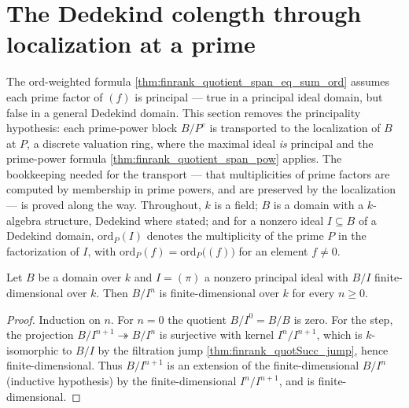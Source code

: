 \section{The Dedekind colength through localization at a prime}
\label{sec:localized_colength}

The ord-weighted formula \ref{thm:finrank_quotient_span_eq_sum_ord} assumes each prime
factor of \((f)\) is principal --- true in a principal ideal domain, but false in a
general Dedekind domain. This section removes the principality hypothesis: each
prime-power block \(B/P^e\) is transported to the localization of \(B\) at \(P\), a
discrete valuation ring, where the maximal ideal \emph{is} principal and the prime-power
formula \ref{thm:finrank_quotient_span_pow} applies. The bookkeeping needed for the
transport --- that multiplicities of prime factors are computed by membership in prime
powers, and are preserved by the localization --- is proved along the way. Throughout,
\(k\) is a field; \(B\) is a domain with a \(k\)-algebra structure, Dedekind where
stated; and for a nonzero ideal \(I \subseteq B\) of a Dedekind domain,
\(\mathrm{ord}_P(I)\) denotes the multiplicity of the prime \(P\) in the factorization of
\(I\), with \(\mathrm{ord}_P(f) = \mathrm{ord}_P\bigl((f)\bigr)\) for an element
\(f \neq 0\).

\begin{theorem}
  \label{thm:moduleFinite_quotient_pow_of_isPrincipal}
  \leanok
  Let \(B\) be a domain over \(k\) and \(I = (\pi)\) a nonzero principal ideal with
  \(B/I\) finite-dimensional over \(k\). Then \(B/I^n\) is finite-dimensional over
  \(k\) for every \(n \ge 0\).
\end{theorem}
\begin{proof}
  \leanok
  Induction on \(n\). For \(n = 0\) the quotient \(B/I^0 = B/B\) is zero. For the step,
  the projection \(B/I^{n+1} \twoheadrightarrow B/I^n\) is surjective with kernel
  \(I^n/I^{n+1}\), which is \(k\)-isomorphic to \(B/I\) by the filtration jump
  \ref{thm:finrank_quotSucc_jump}, hence finite-dimensional. Thus \(B/I^{n+1}\) is an
  extension of the finite-dimensional \(B/I^n\) (inductive hypothesis) by the
  finite-dimensional \(I^n/I^{n+1}\), and is finite-dimensional.
\end{proof}

